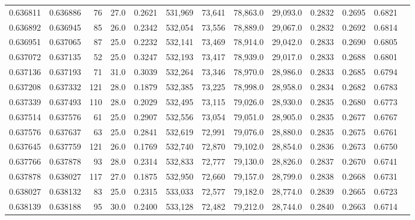 \begin{tabular}{rrrrrrrrrrrrr}
0.636811 & 0.636886 &    76 & 27.0 &                                     0.2621 & 531,969 &  73,641 &  78,863.0 &  29,093.0 & 0.2832 & 0.2695 & 0.6821 \\
0.636892 & 0.636945 &    85 & 26.0 &                                     0.2342 & 532,054 &  73,556 &  78,889.0 &  29,067.0 & 0.2832 & 0.2692 & 0.6814 \\
0.636951 & 0.637065 &    87 & 25.0 &                                     0.2232 & 532,141 &  73,469 &  78,914.0 &  29,042.0 & 0.2833 & 0.2690 & 0.6805 \\
0.637072 & 0.637135 &    52 & 25.0 &                                     0.3247 & 532,193 &  73,417 &  78,939.0 &  29,017.0 & 0.2833 & 0.2688 & 0.6801 \\
0.637136 & 0.637193 &    71 & 31.0 &                                     0.3039 & 532,264 &  73,346 &  78,970.0 &  28,986.0 & 0.2833 & 0.2685 & 0.6794 \\
0.637208 & 0.637332 &   121 & 28.0 &                                     0.1879 & 532,385 &  73,225 &  78,998.0 &  28,958.0 & 0.2834 & 0.2682 & 0.6783 \\
0.637339 & 0.637493 &   110 & 28.0 &                                     0.2029 & 532,495 &  73,115 &  79,026.0 &  28,930.0 & 0.2835 & 0.2680 & 0.6773 \\
0.637514 & 0.637576 &    61 & 25.0 &                                     0.2907 & 532,556 &  73,054 &  79,051.0 &  28,905.0 & 0.2835 & 0.2677 & 0.6767 \\
0.637576 & 0.637637 &    63 & 25.0 &                                     0.2841 & 532,619 &  72,991 &  79,076.0 &  28,880.0 & 0.2835 & 0.2675 & 0.6761 \\
0.637645 & 0.637759 &   121 & 26.0 &                                     0.1769 & 532,740 &  72,870 &  79,102.0 &  28,854.0 & 0.2836 & 0.2673 & 0.6750 \\
0.637766 & 0.637878 &    93 & 28.0 &                                     0.2314 & 532,833 &  72,777 &  79,130.0 &  28,826.0 & 0.2837 & 0.2670 & 0.6741 \\
0.637878 & 0.638027 &   117 & 27.0 &                                     0.1875 & 532,950 &  72,660 &  79,157.0 &  28,799.0 & 0.2838 & 0.2668 & 0.6731 \\
0.638027 & 0.638132 &    83 & 25.0 &                                     0.2315 & 533,033 &  72,577 &  79,182.0 &  28,774.0 & 0.2839 & 0.2665 & 0.6723 \\
0.638139 & 0.638188 &    95 & 30.0 &                                     0.2400 & 533,128 &  72,482 &  79,212.0 &  28,744.0 & 0.2840 & 0.2663 & 0.6714 \\

\end{tabular}
